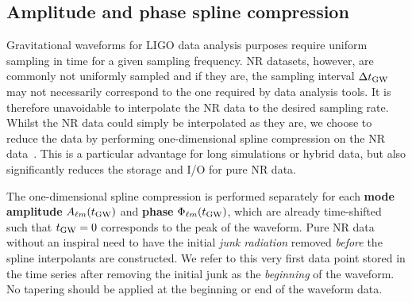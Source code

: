 \documentclass[11pt,tightenlines,article,amssymb,amsmath,amsfonts,superscriptaddress,nofootinbib]{revtex4}
\newcommand{\tGW}{t_{\rm GW}}
\begin{document}
\subsection{Amplitude and phase spline compression}
\label{sec:spline}
Gravitational waveforms for LIGO data analysis purposes require
uniform sampling in time for a given sampling frequency.  NR datasets,
however, are commonly not uniformly sampled and if they are, the
sampling interval $\Delta \tGW$ may not necessarily correspond to the
one required by data analysis tools.  It is therefore unavoidable to
interpolate the NR data to the desired sampling rate. Whilst the NR
data could simply be interpolated as they are, we choose to reduce the
data by performing one-dimensional spline compression on the NR
data~\cite{Galley:2016mvy}. This is a particular advantage for long
simulations or hybrid data, but also significantly reduces the storage
and I/O for pure NR data.

The one-dimensional spline compression is performed separately for each {\bf mode amplitude} $A_{\ell m}(\tGW)$ and {\bf phase} $\Phi_{\ell m}(\tGW)$, which are
already time-shifted such that $\tGW=0$ corresponds to the peak of the waveform. 
Pure NR data without an inspiral need to have the initial \emph{junk radiation} removed \emph{before} the spline interpolants are constructed. We refer to this very first data point stored in the time series after removing the initial junk as the \emph{beginning} of the waveform. No tapering should be applied at the beginning or end of the waveform data. 
\end{document}
